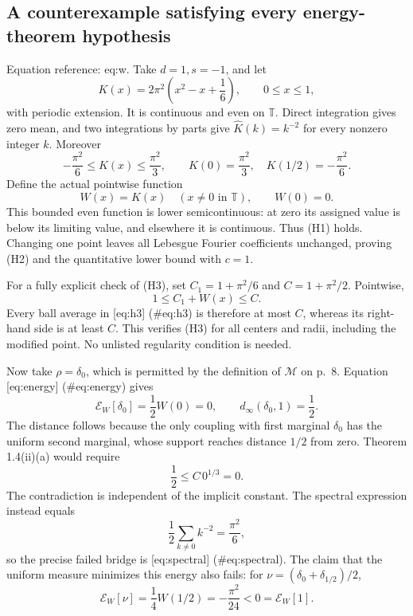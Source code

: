 \documentclass[10pt]{article}
\begin{document}
\subsection*{A counterexample satisfying every energy-theorem hypothesis}
Equation reference: eq:w. Take \(d=1,s=-1\), and let \[K(x)=2\pi^2\left(x^2-x+\frac16\right),\qquad 0\le x\le1,\] with periodic extension. It is continuous and even on \(\mathbb T\). Direct integration gives zero mean, and two integrations by parts give \(\widehat K(k)=k^{-2}\) for every nonzero integer \(k\). Moreover \[-\frac{\pi^2}{6}\le K(x)\le\frac{\pi^2}{3},
 \qquad K(0)=\frac{\pi^2}{3},\quad K(1/2)=-\frac{\pi^2}{6}.\] Define the actual pointwise function \[
 W(x)=K(x)\quad(x\ne0\text{ in }\mathbb T),\qquad W(0)=0.\] This bounded even function is lower semicontinuous: at zero its assigned value is below its limiting value, and elsewhere it is continuous. Thus (H1) holds. Changing one point leaves all Lebesgue Fourier coefficients unchanged, proving (H2) and the quantitative lower bound with \(c=1\).\par
For a fully explicit check of (H3), set \(C_1=1+\pi^2/6\) and \(C=1+\pi^2/2\). Pointwise, \[1\le C_1+W(x)\le C.\] Every ball average in [eq:h3] (\#eq:h3) is therefore at most \(C\), whereas its right-hand side is at least \(C\). This verifies (H3) for all centers and radii, including the modified point. No unlisted regularity condition is needed.\par
Now take \(\rho=\delta_0\), which is permitted by the definition of \(\mathcal M\) on p. 8. Equation [eq:energy] (\#eq:energy) gives \[\mathcal E_W[\delta_0]=\frac12W(0)=0,\qquad
 d_\infty(\delta_0,1)=\frac12.\] The distance follows because the only coupling with first marginal \(\delta_0\) has the uniform second marginal, whose support reaches distance \(1/2\) from zero. Theorem 1.4(ii)(a) would require \[\frac12\le C\,0^{1/3}=0.\] The contradiction is independent of the implicit constant. The spectral expression instead equals \[\frac12\sum_{k\ne0}k^{-2}=\frac{\pi^2}{6},\] so the precise failed bridge is [eq:spectral] (\#eq:spectral). The claim that the uniform measure minimizes this energy also fails: for \(\nu=(\delta_0+\delta_{1/2})/2\), \[\mathcal E_W[\nu]=\frac14W(1/2)=-\frac{\pi^2}{24}<0=\mathcal E_W[1].\]\par
\end{document}

